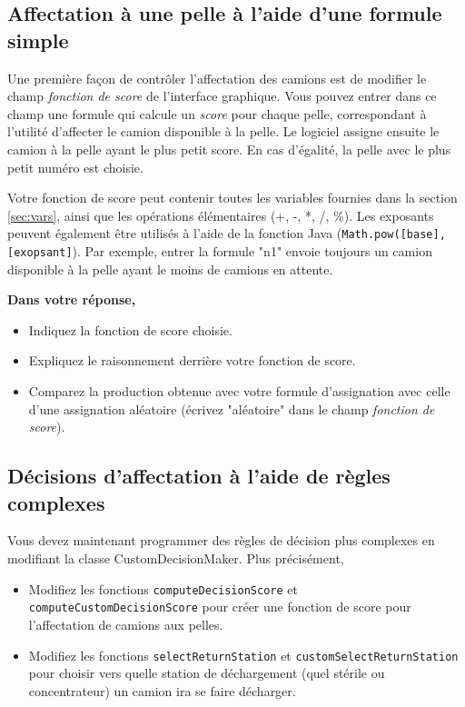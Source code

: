 \subsection{Affectation à une pelle à l'aide d'une formule simple} 
\label{max_prod:score}

Une première façon de contrôler l'affectation des camions est de modifier le champ \textit{fonction de score} de l'interface graphique. Vous pouvez entrer dans ce champ une formule qui calcule un \textit{score} pour chaque pelle, correspondant à l'utilité d'affecter le camion disponible à la pelle. Le logiciel assigne ensuite le camion à la pelle ayant le plus petit score. En cas d'égalité, la pelle avec le plus petit numéro est choisie.

Votre fonction de score peut contenir toutes les variables fournies dans la section \ref{sec:vars}, ainsi que les opérations élémentaires (+, -, *, /, \%). Les exposants peuvent également être utilisés à l'aide de la fonction Java (\verb!Math.pow([base], [exopsant]!). Par exemple, entrer la formule "n1" envoie toujours un camion disponible à la pelle ayant le moins de camions en attente.

\vspace{10pt} 
\noindent\textbf{Dans votre réponse,}  
\begin{itemize}
	\item Indiquez la fonction de score choisie.
	\item Expliquez le raisonnement derrière votre fonction de score.
	\item Comparez la production obtenue avec votre formule d'assignation avec celle d'une assignation aléatoire (écrivez "aléatoire" dans le champ \textit{fonction de score}).
\end{itemize}


\subsection{Décisions d'affectation à l'aide de règles complexes} 
\label{max_prod:code}


Vous devez maintenant programmer des règles de décision plus complexes en modifiant la classe CustomDecisionMaker. Plus précisément, 

\begin{itemize}
	\item Modifiez les fonctions \verb!computeDecisionScore! et \verb!computeCustomDecisionScore! pour créer une fonction de score pour l'affectation de camions aux pelles.
	\item Modifiez les fonctions \verb!selectReturnStation! et \verb!customSelectReturnStation! pour choisir vers quelle station de déchargement (quel stérile ou concentrateur) un camion ira se faire décharger.
\end{itemize}

